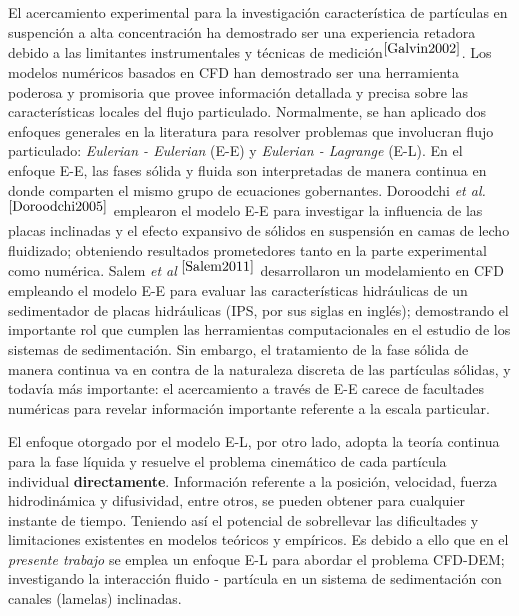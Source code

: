 El acercamiento experimental para la investigaci\'on caracter\'istica de part\'iculas en suspenci\'on a alta concentraci\'on ha demostrado ser una experiencia retadora debido a las limitantes instrumentales y t\'ecnicas de medici\'on$^{\cite{Galvin2002}}$. Los modelos num\'ericos basados en CFD han demostrado ser una herramienta poderosa y promisoria que provee informaci\'on detallada y precisa sobre las caracter\'isticas locales del flujo particulado. Normalmente, se han aplicado dos enfoques generales en la literatura para resolver problemas que involucran flujo particulado: \textit{Eulerian - Eulerian} (E-E) y \textit{Eulerian - Lagrange} (E-L). En el enfoque E-E, las fases s\'olida y fluida son interpretadas de manera continua en donde comparten el mismo grupo de ecuaciones gobernantes. Doroodchi \textit{et al.}$^{\cite{Doroodchi2005}}$ emplearon el modelo E-E para investigar la influencia de las placas inclinadas y el efecto expansivo de s\'olidos en suspensi\'on en camas de lecho fluidizado; obteniendo resultados prometedores tanto en la parte experimental como num\'erica. Salem \textit{et al} $^{\cite{Salem2011}}$ desarrollaron un modelamiento en CFD empleando el modelo E-E para evaluar las caracter\'isticas hidr\'aulicas de un sedimentador de placas hidr\'aulicas (IPS, por sus siglas en ingl\'es); demostrando el importante rol que cumplen las herramientas computacionales en el estudio de los sistemas de sedimentaci\'on. Sin embargo, el tratamiento de la fase s\'olida de manera continua va en contra de la naturaleza discreta de las part\'iculas s\'olidas, y todav\'ia m\'as importante: el acercamiento a trav\'es de E-E carece de facultades num\'ericas para revelar informaci\'on importante referente a la escala particular.

\noindent
\justify

El enfoque otorgado por el modelo E-L, por otro lado, adopta la teor\'ia continua para la fase l\'iquida y resuelve el problema cinem\'atico de cada part\'icula individual \textbf{directamente}. Informaci\'on referente a la posici\'on, velocidad, fuerza hidrodin\'amica y difusividad, entre otros, se pueden obtener para cualquier instante de tiempo. Teniendo as\'i el potencial de sobrellevar las dificultades y limitaciones existentes en modelos te\'oricos y emp\'iricos. Es debido a ello que en el \textit{presente trabajo} se emplea un enfoque E-L para abordar el problema CFD-DEM; investigando la interacci\'on fluido - part\'icula en un sistema de sedimentaci\'on con canales (lamelas) inclinadas.

